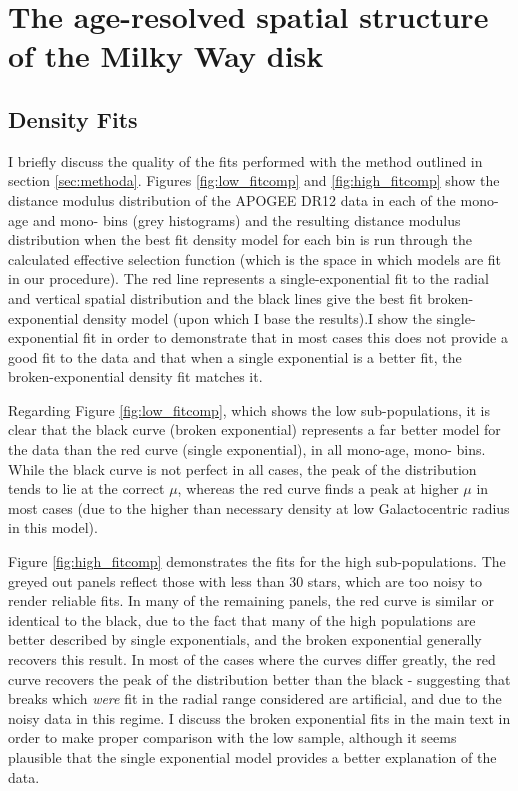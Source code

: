 \chapter{The age-resolved spatial structure of the Milky Way disk}

\section{Density Fits}
\label{sec:densityfits}
I briefly discuss the quality of the fits performed with the method outlined in section \ref{sec:methoda}. Figures \ref{fig:low_fitcomp} and \ref{fig:high_fitcomp} show the distance modulus distribution of the APOGEE DR12 data in each of the mono-age and mono-\feh{} bins (grey histograms) and the resulting distance modulus distribution when the best fit density model for each bin is run through the calculated effective selection function (which is the space in which models are fit in our procedure). The red line represents a single-exponential fit to the radial and vertical spatial distribution and the black lines give the best fit broken-exponential density model (upon which I base the results).I show the single-exponential fit in order to demonstrate that in most cases this does not provide a good fit to the data and that when a single exponential is a better fit, the broken-exponential density fit matches it.

Regarding Figure \ref{fig:low_fitcomp}, which shows the low \afe{} sub-populations, it is clear that the black curve (broken exponential) represents a far better model for the data than the red curve (single exponential), in all mono-age, mono-\feh{} bins. While the black curve is not perfect in all cases, the peak of the distribution tends to lie at the correct $\mu$, whereas the red curve finds a peak at higher $\mu$ in most cases (due to the higher than necessary density at low Galactocentric radius in this model).

 Figure \ref{fig:high_fitcomp} demonstrates the fits for the high \afe{} sub-populations. The greyed out panels reflect those with less than 30 stars, which are too noisy to render reliable fits. In many of the remaining panels, the red curve is similar or identical to the black, due to the fact that many of the high \afe{} populations are better described by single exponentials, and the broken exponential generally recovers this result. In most of the cases where the curves differ greatly, the red curve recovers the peak of the distribution better than the black - suggesting that breaks which \emph{were} fit in the radial range considered are artificial, and due to the noisy data in this regime. I discuss the broken exponential fits in the main text in order to make proper comparison with the low \afe{} sample, although it seems plausible that the single exponential model provides a better explanation of the data. 

